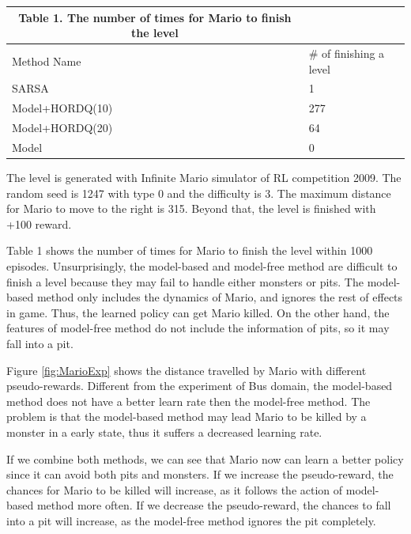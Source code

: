 \begin{table}
\begin{tabular}[h]{l|l}
\hline
\multicolumn{1}{c}{Table 1. The number of times for Mario to finish the level}\\
\hline
Method Name & \# of finishing a level\\
\hline
SARSA    & 1\\
Model+HORDQ(10)    & 277\\
Model+HORDQ(20)     & 64\\
Model        & 0\\
\hline
\hline
\end{tabular}
\end{table}


The level is generated with Infinite Mario simulator of RL competition 2009. The random seed is 1247
with type 0 and the difficulty is 3.
The maximum distance for Mario to move to the right is 315.
Beyond that, the level is finished with +100 reward.

Table 1 shows the number of times for Mario to finish the level within 1000 episodes.
Unsurprisingly, the model-based and model-free method are difficult
to finish a level because they may fail to handle either monsters or pits.
The model-based method only includes the dynamics of Mario, and ignores the rest of effects in game.
Thus, the learned policy can get Mario killed. On the other hand, the features of model-free method
do not include the information of pits, so it may fall into a pit.

Figure \ref{fig:MarioExp} shows the distance travelled by Mario with different pseudo-rewards.
Different from the experiment of Bus domain, the model-based method does not have
a better learn rate then the model-free method. The problem is that the model-based method
may lead Mario to be killed by a monster in a early state, thus it suffers a decreased learning rate.

If we combine both methods, we can see that Mario now can learn a better policy since
it can avoid both pits and monsters.
If we increase the pseudo-reward, the chances for Mario to be killed will increase, as it follows
the action of model-based method more often.
If we decrease the pseudo-reward, the chances to fall into a pit will increase, as the model-free  
method ignores the pit completely.

